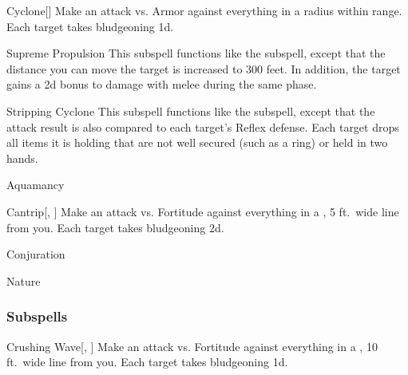 \begin{ability}[\nth{4}]{Cyclone}[]
Make an attack vs. Armor against everything in a \areamed radius within \rngmed range.
\hit Each target takes bludgeoning  \minus1d.
\end{ability}
\vspace{0.25em}


\begin{ability}[\nth{4}]{Supreme Propulsion}
This subspell functions like the  subspell, except that the distance you can move the target is increased to 300 feet.
In addition, the target gains a \plus2d bonus to damage with melee  during the same phase.
\end{ability}
\vspace{0.25em}


\begin{ability}[\nth{6}]{Stripping Cyclone}
This subspell functions like the  subspell, except that the attack result is also compared to each target's Reflex defense.
\hit Each target drops all items it is holding that are not well secured (such as a ring) or held in two hands.
\end{ability}
\vspace{0.25em}

\newpage
\begin{spellsection}{Aquamancy}

\begin{spellheader}
\end{spellheader}


\begin{ability}{Cantrip}[, ]
Make an attack vs. Fortitude against everything in a \areamed, 5 ft.\ wide line from you.
\hit Each target takes bludgeoning  \minus2d.
\end{ability}




 Conjuration

 Nature
\end{spellsection}


\subsubsection{Subspells}


\begin{ability}[\nth{1}]{Crushing Wave}[, ]
Make an attack vs. Fortitude against everything in a \arealarge, 10 ft.\ wide line from you.
\hit Each target takes bludgeoning  \minus1d.
\end{ability}
\vspace{0.25em}



